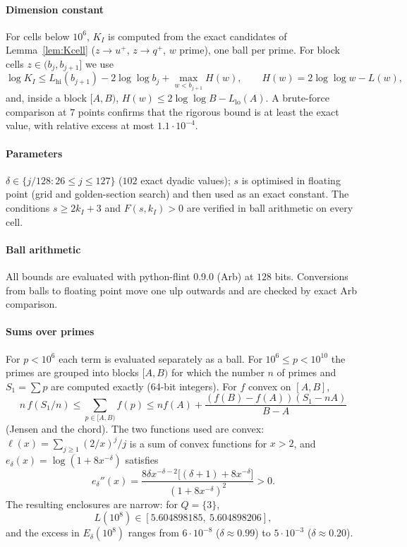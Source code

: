\documentclass[preprint,11pt]{elsarticle}
\theoremstyle{definition}
\theoremstyle{remark}
\numberwithin{equation}{section}
\begin{document}
\paragraph{Dimension constant}
For cells below $10^6$, $K_I$ is computed from the exact candidates of
Lemma~\ref{lem:Kcell} ($z\to u^+$, $z\to q^+$, $w$ prime), one ball per
prime. For block cells $z\in(b_j,b_{j+1}]$ we use
\[
  \log K_I\le L_{\mathrm{hi}}(b_{j+1})-2\log\log b_j+\max_{w<b_{j+1}}H(w),
  \qquad H(w)=2\log\log w-L(w),
\]
and, inside a block $[A,B)$, $H(w)\le2\log\log B-L_{\mathrm{lo}}(A)$. A
brute-force comparison at $7$ points confirms that the rigorous bound is
at least the exact value, with relative excess at most $1.1\cdot10^{-4}$.

\paragraph{Parameters}
$\delta\in\{j/128:26\le j\le127\}$ ($102$ exact dyadic values); $s$ is
optimised in floating point (grid and golden-section search) and then used
as an exact constant. The conditions $s\ge2k_I+3$ and $F(s,k_I)>0$ are
verified in ball arithmetic on every cell.

\paragraph{Ball arithmetic}
All bounds are evaluated with python-flint 0.9.0 (Arb) at $128$ bits.
Conversions from balls to floating point move one ulp outwards and are
checked by exact Arb comparison.

\paragraph{Sums over primes}
For $p<10^6$ each term is evaluated separately as a ball. For
$10^6\le p<10^{10}$ the primes are grouped into blocks $[A,B)$ for which the
number $n$ of primes and $S_1=\sum p$ are computed exactly (64-bit
integers). For $f$ convex on $[A,B]$,
\[
  n\,f(S_1/n)\le\sum_{p\in[A,B)}f(p)\le nf(A)+\frac{(f(B)-f(A))(S_1-nA)}{B-A}
\]
(Jensen and the chord). The two functions used are convex:
$\ell(x)=\sum_{j\ge1}(2/x)^j/j$ is a sum of convex functions for $x>2$, and
$e_\delta(x)=\log(1+8x^{-\delta})$ satisfies
\[
  e_\delta''(x)=\frac{8\delta x^{-\delta-2}\bigl[(\delta+1)+8x^{-\delta}\bigr]}{(1+8x^{-\delta})^2}>0 .
\]
The resulting enclosures are narrow: for $Q=\{3\}$,
\[
  L(10^8)\in[5.604898185,\ 5.604898206],
\]
and the excess in $E_\delta(10^8)$
ranges from $6\cdot10^{-8}$ ($\delta\approx0.99$) to $5\cdot10^{-3}$
($\delta\approx0.20$).
\end{document}
